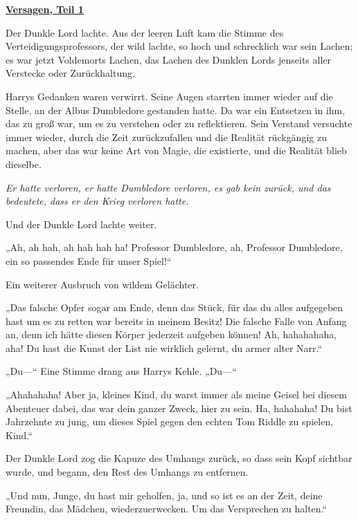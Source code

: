 

\hypertarget{versagen-teil-1}{%

\textbf{\uline{Versagen, Teil 1}}

Der Dunkle Lord lachte. Aus der leeren Luft kam die Stimme des Verteidigungsprofessors, der wild lachte, so hoch und schrecklich war sein Lachen; es war jetzt Voldemorts Lachen, das Lachen des Dunklen Lords jenseits aller Verstecke oder Zurückhaltung.

Harrys Gedanken waren verwirrt. Seine Augen starrten immer wieder auf die Stelle, an der Albus Dumbledore gestanden hatte. Da war ein Entsetzen in ihm, das zu groß war, um es zu verstehen oder zu reflektieren. Sein Verstand versuchte immer wieder, durch die Zeit zurückzufallen und die Realität rückgängig zu machen, aber das war keine Art von Magie, die existierte, und die Realität blieb dieselbe.

\emph{Er hatte verloren, er hatte Dumbledore verloren, es gab kein zurück, und das bedeutete, dass er den Krieg verloren hatte.}

Und der Dunkle Lord lachte weiter.

„Ah, ah hah, ah hah hah ha! Professor Dumbledore, ah, Professor Dumbledore, ein so passendes Ende für unser Spiel!“

Ein weiterer Ausbruch von wildem Gelächter.

„Das falsche Opfer sogar am Ende, denn das Stück, für das du alles aufgegeben hast um es zu retten war bereits in meinem Besitz! Die falsche Falle von Anfang an, denn ich hätte diesen Körper jederzeit aufgeben können! Ah, hahahahaha, aha! Du hast die Kunst der List nie wirklich gelernt, du armer alter Narr.“

„Du—“ Eine Stimme drang aus Harrys Kehle. „Du—“

„Ahahahaha! Aber ja, kleines Kind, du warst immer als meine Geisel bei diesem Abenteuer dabei, das war dein ganzer Zweck, hier zu sein. Ha, hahahaha! Du bist Jahrzehnte zu jung, um dieses Spiel gegen den echten Tom Riddle zu spielen, Kind.“

Der Dunkle Lord zog die Kapuze des Umhangs zurück, so dass sein Kopf sichtbar wurde, und begann, den Rest des Umhangs zu entfernen.

„Und nun, Junge, du hast mir geholfen, ja, und so ist es an der Zeit, deine Freundin, das Mädchen, wiederzuerwecken. Um das Versprechen zu halten.“

}
